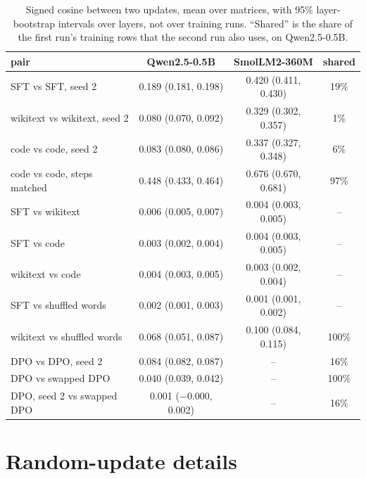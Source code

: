 \begin{table}[H]
\caption{Signed cosine between two updates, mean over matrices, with 95\%
layer-bootstrap intervals over layers, not over training runs. ``Shared'' is
the share of the first run's training rows that the second run also uses, on
Qwen2.5-0.5B.}
\label{tab:signed}
\begin{center}
\small
\begin{tabular}{lccc}
\toprule
pair & Qwen2.5-0.5B & SmolLM2-360M & shared \\
\midrule
SFT vs SFT, seed 2                & 0.189 (0.181, 0.198) & 0.420 (0.411, 0.430) & 19\% \\
wikitext vs wikitext, seed 2      & 0.080 (0.070, 0.092) & 0.329 (0.302, 0.357) & 1\% \\
code vs code, seed 2              & 0.083 (0.080, 0.086) & 0.337 (0.327, 0.348) & 6\% \\
code vs code, steps matched       & 0.448 (0.433, 0.464) & 0.676 (0.670, 0.681) & 97\% \\
\midrule
SFT vs wikitext                   & 0.006 (0.005, 0.007) & 0.004 (0.003, 0.005) & -- \\
SFT vs code                       & 0.003 (0.002, 0.004) & 0.004 (0.003, 0.005) & -- \\
wikitext vs code                  & 0.004 (0.003, 0.005) & 0.003 (0.002, 0.004) & -- \\
SFT vs shuffled words             & 0.002 (0.001, 0.003) & 0.001 (0.001, 0.002) & -- \\
wikitext vs shuffled words        & 0.068 (0.051, 0.087) & 0.100 (0.084, 0.115) & 100\% \\
\midrule
DPO vs DPO, seed 2                & 0.084 (0.082, 0.087) & -- & 16\% \\
DPO vs swapped DPO                & 0.040 (0.039, 0.042) & -- & 100\% \\
DPO, seed 2 vs swapped DPO        & 0.001 ($-$0.000, 0.002) & -- & 16\% \\
\bottomrule
\end{tabular}
\end{center}
\end{table}

\section{Random-update details}
\label{app:damage}

